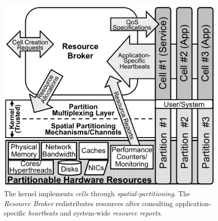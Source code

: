 \begin{figure}[t]
\centering
\includegraphics[width=0.885\linewidth]{Figures/NewPolicyFig-Tess}
\caption{
The \tess kernel implements \emph{cells} through \emph{spatial-partitioning}.
The \emph{Resource Broker} redistributes resources after consulting application-specific
\emph{heartbeats} and system-wide \emph{resource reports}.
}
\label{fig:tess-arch}
\end{figure}


  
